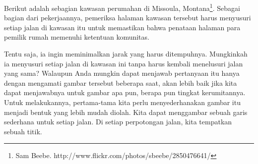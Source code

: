 \begin{example}{}
Berikut adalah sebagian kawasan perumahan di Missoula, Montana\footnote{Sam Beebe. http://www.flickr.com/photos/sbeebe/2850476641/}.  Sebagai bagian dari pekerjaannya, pemeriksa halaman kawasan tersebut harus menyusuri setiap jalan di kawasan itu untuk memastikan bahwa penataan halaman para pemilik rumah memenuhi ketentuan komunitas.\\
\begin{center}
\par{}\label{fig:GraphPicture}%

\end{center}

Tentu saja, ia ingin meminimalkan jarak yang harus ditempuhnya.  Mungkinkah ia menyusuri setiap jalan di kawasan ini tanpa harus kembali menelusuri jalan yang sama?  Walaupun Anda mungkin dapat menjawab pertanyaan itu hanya dengan mengamati gambar tersebut beberapa saat, akan lebih baik jika kita dapat menjawabnya untuk gambar apa pun, berapa pun tingkat kerumitannya.\\

Untuk melakukannya, pertama-tama kita perlu menyederhanakan gambar itu menjadi bentuk yang lebih mudah diolah.  Kita dapat menggambar sebuah garis sederhana untuk setiap jalan.  Di setiap perpotongan jalan, kita tempatkan sebuah titik. \\
 
 \par{}\label{fig:GraphPictureDot}%

\end{example}

